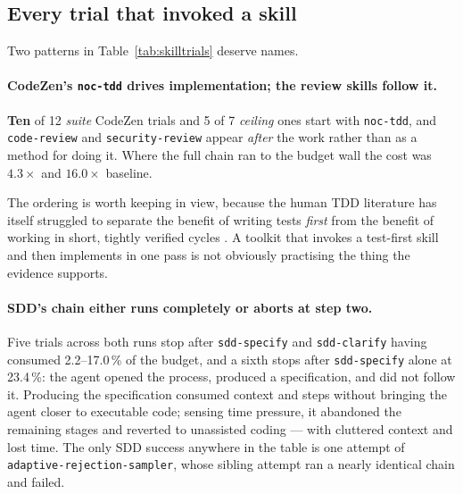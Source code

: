 \documentclass[11pt,a4paper]{article}
\newcommand{\code}[1]{\texttt{\small #1}}
\newcommand{\task}[1]{\texttt{\footnotesize #1}}
\begin{document}
\subsection{Every trial that invoked a skill}

\begin{table}[htbp]
\centering
\caption{All 30 trials across both runs that invoked a toolkit skill, with the invocation
order, sub-agents spawned, reward, budget consumed and cost. ``censored'' marks a Harbor
timeout, which for four of these rows arrived \emph{after} the verifier would have scored 1.0.}
\label{tab:skilltrials}
\scriptsize
\resizebox{\linewidth}{!}{}
\end{table}

Two patterns in Table~\ref{tab:skilltrials} deserve names.

\paragraph{CodeZen's \code{noc-tdd} drives implementation; the review skills follow it.}
\textbf{Ten} of 12 \emph{suite} CodeZen trials and 5 of 7 \emph{ceiling} ones start with
\code{noc-tdd}, and \code{code-review} and \code{security-review} appear \emph{after} the work
rather than as a method for doing it.
Where the full chain ran to the budget wall the cost was $4.3\times$ and $16.0\times$
baseline.

The ordering is worth keeping in view, because the human TDD literature has itself struggled
to separate the benefit of writing tests \emph{first} from the benefit of working in short,
tightly verified cycles \citep{fucci2017dissection}. A toolkit that invokes a test-first skill
and then implements in one pass is not obviously practising the thing the evidence supports.

\paragraph{SDD's chain either runs completely or aborts at step two.} Five trials across both
runs stop after \code{sdd-specify} and \code{sdd-clarify} having consumed 2.2--17.0\,\% of the
budget, and a sixth stops after \code{sdd-specify} alone at 23.4\,\%: the agent opened the
process, produced a specification, and did not follow it.
Producing the specification consumed context and steps without bringing the agent closer to
executable code; sensing time pressure, it abandoned the remaining stages and reverted to
unassisted coding --- with cluttered context and lost time. The only SDD success anywhere in
the table is one attempt of \task{adaptive-rejection-sampler}, whose sibling attempt ran a
nearly identical chain and failed.
\end{document}
